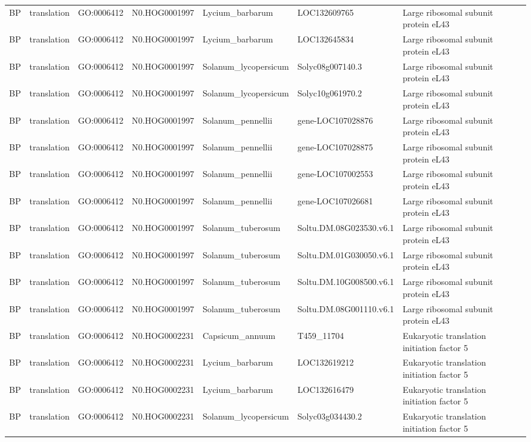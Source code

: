 \begin{table}
\begin{tabular}[t]{lllllll}
BP & translation & GO:0006412 & N0.HOG0001997 & Lycium\_barbarum & LOC132609765 & Large ribosomal subunit protein eL43\\
BP & translation & GO:0006412 & N0.HOG0001997 & Lycium\_barbarum & LOC132645834 & Large ribosomal subunit protein eL43\\
BP & translation & GO:0006412 & N0.HOG0001997 & Solanum\_lycopersicum & Solyc08g007140.3 & Large ribosomal subunit protein eL43\\
BP & translation & GO:0006412 & N0.HOG0001997 & Solanum\_lycopersicum & Solyc10g061970.2 & Large ribosomal subunit protein eL43\\
BP & translation & GO:0006412 & N0.HOG0001997 & Solanum\_pennellii & gene-LOC107028876 & Large ribosomal subunit protein eL43\\
BP & translation & GO:0006412 & N0.HOG0001997 & Solanum\_pennellii & gene-LOC107028875 & Large ribosomal subunit protein eL43\\
BP & translation & GO:0006412 & N0.HOG0001997 & Solanum\_pennellii & gene-LOC107002553 & Large ribosomal subunit protein eL43\\
BP & translation & GO:0006412 & N0.HOG0001997 & Solanum\_pennellii & gene-LOC107026681 & Large ribosomal subunit protein eL43\\
BP & translation & GO:0006412 & N0.HOG0001997 & Solanum\_tuberosum & Soltu.DM.08G023530.v6.1 & Large ribosomal subunit protein eL43\\
BP & translation & GO:0006412 & N0.HOG0001997 & Solanum\_tuberosum & Soltu.DM.01G030050.v6.1 & Large ribosomal subunit protein eL43\\
BP & translation & GO:0006412 & N0.HOG0001997 & Solanum\_tuberosum & Soltu.DM.10G008500.v6.1 & Large ribosomal subunit protein eL43\\
BP & translation & GO:0006412 & N0.HOG0001997 & Solanum\_tuberosum & Soltu.DM.08G001110.v6.1 & Large ribosomal subunit protein eL43\\
BP & translation & GO:0006412 & N0.HOG0002231 & Capsicum\_annuum & T459\_11704 & Eukaryotic translation initiation factor 5\\
BP & translation & GO:0006412 & N0.HOG0002231 & Lycium\_barbarum & LOC132619212 & Eukaryotic translation initiation factor 5\\
BP & translation & GO:0006412 & N0.HOG0002231 & Lycium\_barbarum & LOC132616479 & Eukaryotic translation initiation factor 5\\
BP & translation & GO:0006412 & N0.HOG0002231 & Solanum\_lycopersicum & Solyc03g034430.2 & Eukaryotic translation initiation factor 5\\

\end{tabular}
\end{table}
